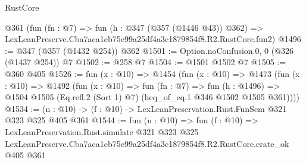 \begin{lexlean}{RustCore}
\begin{coremodule}
    @361
    (fun (fn : @7) =>
    fun (h : @347 (@357 (@1446 @43)) @362) =>
    LexLeanPreserve.Cba7aca1eb75e99a25df4a3c1879854f8.R2.RustCore.fun2)
@1496 := @347 (@357 (@1432 @254)) @362
@1501 := Option.noConfusion.{0, 0} (@326 (@1437 @254)) @7
@1502 := @258 @7
@1504 := @1501 @1502 @7
@1505 := @360 @405
@1526 := fun (x : @10) =>
  @1454
    (fun (x : @10) =>
    @1473
      (fun (x : @10) =>
      @1492
        (fun (x : @10) =>
        fun (fn : @7) =>
        fun (h : @1496) =>
        @1504 @1505 (Eq.refl.{2} (Sort 1) @7) (heq_of_eq.{1} @346 @1502 @1505 @361))))
@1534 := (n : @10) -> (f : @10) -> LexLeanPreservation.Rust.FunSem @321 @323 @325 @405 @361
@1544 := fun (n : @10) =>
  fun (f : @10) =>
  LexLeanPreservation.Rust.simulate
    @321
    @323
    @325
    LexLeanPreserve.Cba7aca1eb75e99a25df4a3c1879854f8.R2.RustCore.crate_ok
    @405
    @361
\end{coremodule}
\end{lexlean}
